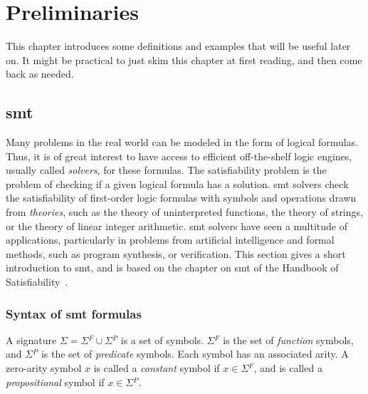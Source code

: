 \chapter{Preliminaries}
\label{chapter:preliminaries}

This chapter introduces some definitions and examples that will be useful later
on. It might be practical to just skim this chapter at first reading, and then
come back as needed.

\section{\gls{smt}}
\label{sec:smt}

Many problems in the real world can be modeled in the form of logical formulas.
Thus, it is of great interest to have access to efficient off-the-shelf
logic engines, usually called \textit{solvers}, for these formulas.
The satisfiability problem is the problem of checking if a given logical formula
has a solution.
\gls{smt} solvers check the satisfiability of first-order logic formulas with
symbols and operations drawn from \textit{theories}, such as the theory of
uninterpreted functions, the theory of strings, or the theory of linear integer
arithmetic.
\gls{smt} solvers have seen a multitude of applications, particularly in
problems from artificial intelligence and formal methods, such as program
synthesis, or verification.
This section gives a short introduction to \gls{smt}, and is based on the
chapter on \gls{smt} of the Handbook of Satisfiability~\cite{Biere:2009:HSV}.

\subsection{Syntax of \gls{smt} formulas}
\label{sec:smt-syntax}

\begin{definition}[Signature]
  A signature $\Sigma{} = \Sigma{}^F \cup{} \Sigma{}^P$ is a set of symbols.
  $\Sigma{}^F$ is the set of \textit{function} symbols, and $\Sigma{}^P$ is the
  set of \textit{predicate} symbols.
  Each symbol has an associated arity. A zero-arity symbol $x$ is called a
  \textit{constant} symbol if $x \in \Sigma{}^F$, and is called a
  \textit{propositional} symbol if $x \in \Sigma{}^P$.
\end{definition}

